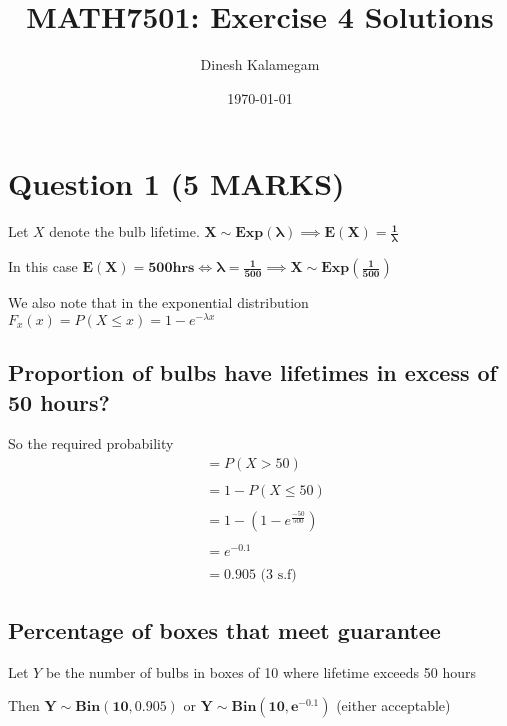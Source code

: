 \documentclass[11pt]{article}
\begin{document}
\title{MATH7501: Exercise 4 Solutions}
\author{Dinesh Kalamegam}
\date{\today}
\maketitle


\setlength{\parindent}{0pt}
\setlength{\parskip}{\baselineskip}
\newtheorem{theorem}{Theorem}[section]
\newtheorem{definition}[theorem]{Defintion}
\newtheorem{proposition}[theorem]{Proposition}
\newtheorem{corollary}[theorem]{Corollary}

\section{Question 1 (5 MARKS)}
Let $X$ denote the bulb lifetime. $\bm{X \sim Exp(\lambda) \implies E(X) = \frac{1}{\lambda}}$

In this case $\bm{E(X) = 500hrs \iff \lambda = \frac{1}{500}} \implies \bm{X \sim Exp(\frac{1}{500})}$

We also note that in the exponential distribution $F_x(x) = P(X \leq x) = 1 - e^{-\lambda x}$
\subsection{Proportion of bulbs have lifetimes in excess of 50 hours?}
So the required probability
\begin{align*}
                        &= P(X > 50)\\ \\
                         &= 1 - P(X \leq 50) \\ \\
                         &= 1 - (1 - e^{\frac{-50}{500}}) \\ \\
                         &= e^{-0.1} \\ \\
                         &= \boxed{\bm{0.905}} \text{ (3 s.f) }
\end{align*}

\subsection{Percentage of boxes that meet guarantee}
Let $Y$ be the number of bulbs in boxes of 10 where lifetime exceeds 50 hours

Then $\bm{Y \sim Bin(10,0.905)}$ or $\bm{Y \sim Bin(10,e^{-0.1})}$ (either acceptable)
\end{document}
